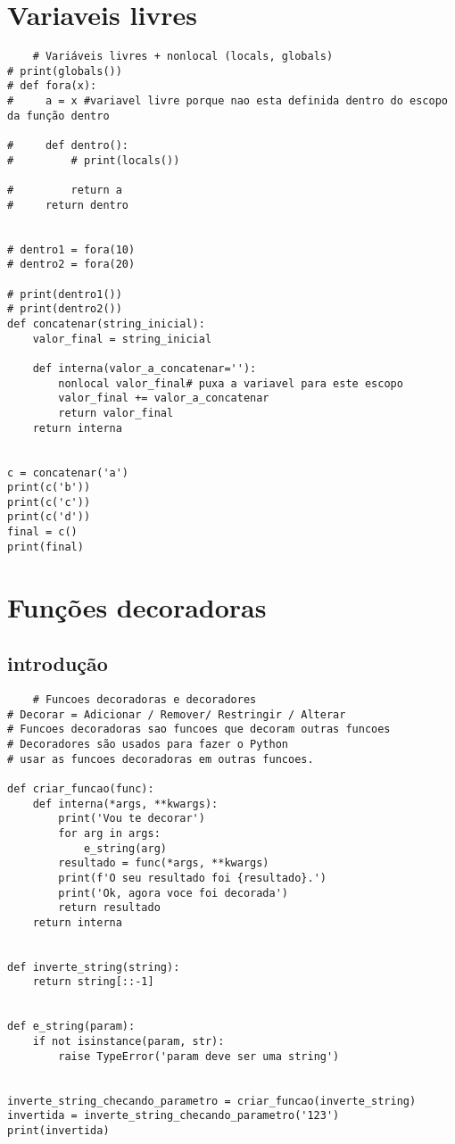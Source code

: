 \documentclass{article}
\begin{document}
\section{Variaveis livres}
\begin{lstlisting}
    # Variáveis livres + nonlocal (locals, globals)
# print(globals())
# def fora(x):
#     a = x #variavel livre porque nao esta definida dentro do escopo da função dentro

#     def dentro():
#         # print(locals())

#         return a
#     return dentro


# dentro1 = fora(10)
# dentro2 = fora(20)

# print(dentro1())
# print(dentro2())
def concatenar(string_inicial):
    valor_final = string_inicial

    def interna(valor_a_concatenar=''):
        nonlocal valor_final# puxa a variavel para este escopo
        valor_final += valor_a_concatenar
        return valor_final
    return interna


c = concatenar('a')
print(c('b'))
print(c('c'))
print(c('d'))
final = c()
print(final)
\end{lstlisting}
\section{Funções decoradoras}
\subsection{introdução}
\begin{lstlisting}
    # Funcoes decoradoras e decoradores
# Decorar = Adicionar / Remover/ Restringir / Alterar
# Funcoes decoradoras sao funcoes que decoram outras funcoes
# Decoradores são usados para fazer o Python
# usar as funcoes decoradoras em outras funcoes.

def criar_funcao(func):
    def interna(*args, **kwargs):
        print('Vou te decorar')
        for arg in args:
            e_string(arg)
        resultado = func(*args, **kwargs)
        print(f'O seu resultado foi {resultado}.')
        print('Ok, agora voce foi decorada')
        return resultado
    return interna


def inverte_string(string):
    return string[::-1]


def e_string(param):
    if not isinstance(param, str):
        raise TypeError('param deve ser uma string')


inverte_string_checando_parametro = criar_funcao(inverte_string)
invertida = inverte_string_checando_parametro('123')
print(invertida)
\end{lstlisting}    
\end{document}
